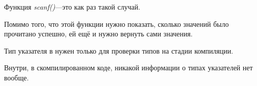 Функция \emph{scanf()}---это как раз такой случай.

Помимо того, что этой функции нужно показать, сколько значений было прочитано успешно, ей ещё и нужно вернуть сами значения.

Тип указателя в \CCpp нужен только для проверки типов на стадии компиляции.

Внутри, в скомпилированном коде, никакой информации о типах указателей нет вообще.





